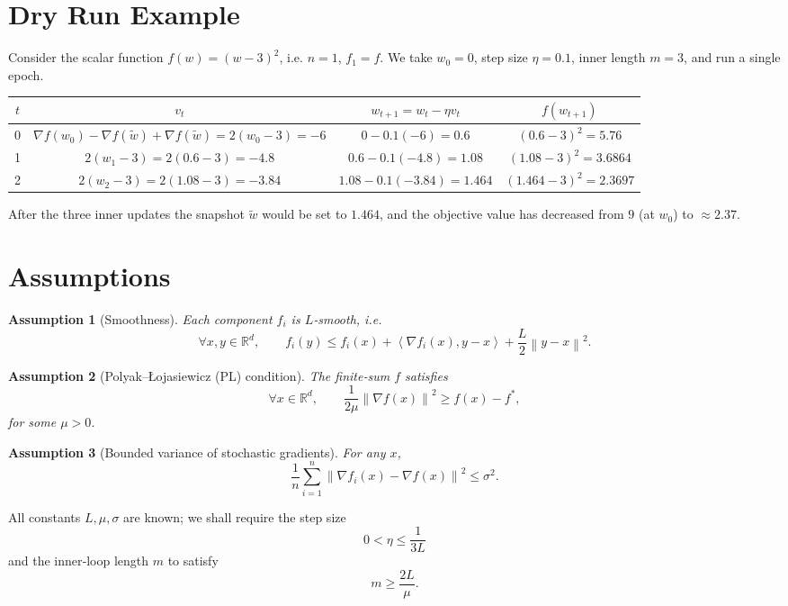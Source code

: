 \documentclass[11pt]{article}
\newtheorem{assumption}{Assumption}
\newcommand{\R}{\mathbb{R}}
\newcommand{\norm}[1]{\left\|#1\right\|}
\newcommand{\inner}[2]{\left\langle #1,#2\right\rangle}
\begin{document}
\section*{Dry Run Example}
Consider the scalar function $f(w)=(w-3)^{2}$, i.e. $n=1$, $f_{1}=f$.  
We take $w_{0}=0$, step size $\eta=0.1$, inner length $m=3$, and run a single epoch.

\begin{center}
\begin{tabular}{c|c|c|c}
$t$ & $v_t$ & $w_{t+1}=w_t-\eta v_t$ & $f(w_{t+1})$\\ \hline
0 & $\nabla f(w_0)-\nabla f(\tilde w)+\nabla f(\tilde w)=2(w_0-3)= -6$ & $0-0.1(-6)=0.6$ & $(0.6-3)^2=5.76$\\
1 & $2(w_1-3)=2(0.6-3)=-4.8$ & $0.6-0.1(-4.8)=1.08$ & $(1.08-3)^2=3.6864$\\
2 & $2(w_2-3)=2(1.08-3)=-3.84$ & $1.08-0.1(-3.84)=1.464$ & $(1.464-3)^2=2.3697$
\end{tabular}
\end{center}
After the three inner updates the snapshot $\tilde w$ would be set to $1.464$, and the objective value has decreased from $9$ (at $w_0$) to $\approx2.37$.

\newpage
\section*{Assumptions}
\begin{assumption}[Smoothness]\label{ass:smooth}
Each component $f_i$ is $L$‑smooth, i.e.
\[
    \forall x,y\in\R^{d},\qquad 
    f_i(y)\le f_i(x)+\inner{\nabla f_i(x)}{y-x}+\frac{L}{2}\norm{y-x}^{2}.
\]
\end{assumption}
\begin{assumption}[Polyak–Łojasiewicz (PL) condition]\label{ass:pl}
The finite‑sum $f$ satisfies
\[
    \forall x\in\R^{d},\qquad
    \frac{1}{2\mu}\norm{\nabla f(x)}^{2}\ge f(x)-f^{*},
\]
for some $\mu>0$.
\end{assumption}
\begin{assumption}[Bounded variance of stochastic gradients]\label{ass:var}
For any $x$,
\[
    \frac{1}{n}\sum_{i=1}^{n}\norm{\nabla f_i(x)-\nabla f(x)}^{2}\le\sigma^{2}.
\]
\end{assumption}
All constants $L,\mu,\sigma$ are known; we shall require the step size
\[
    0<\eta\le\frac{1}{3L}
\tag{A1}
\]
and the inner‑loop length $m$ to satisfy
\[
    m\ge \frac{2L}{\mu}.
\tag{A2}
\]
\end{document}
